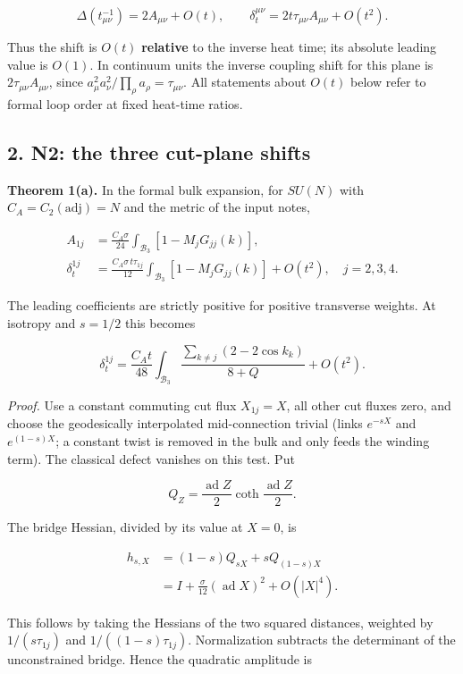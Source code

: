 \documentclass[11pt,a4paper]{article}
\begin{document}
\[\Delta(t_{\mu\nu}^{-1})=2A_{\mu\nu}+O(t),\qquad
 \delta_t^{\mu\nu}=2t\tau_{\mu\nu}A_{\mu\nu}+O(t^2).\]

Thus the shift is \(O(t)\) \textbf{relative} to the inverse heat time;
its absolute leading value is \(O(1)\). In continuum units the inverse
coupling shift for this plane is \(2\tau_{\mu\nu}A_{\mu\nu}\), since
\(a_\mu^2a_\nu^2/\prod_\rho a_\rho=\tau_{\mu\nu}\). All statements about
\(O(t)\) below refer to formal loop order at fixed heat-time ratios.

\hypertarget{n2-the-three-cut-plane-shifts}{%
\subsection{2. N2: the three cut-plane
shifts}\label{n2-the-three-cut-plane-shifts}}

\textbf{Theorem 1(a).} In the formal bulk expansion, for \(SU(N)\) with
\(C_A=C_2(\mathrm{adj})=N\) and the metric of the input notes,

\[\boxed{\begin{aligned}
 A_{1j}&=\frac{C_A\sigma}{24}
 \int_{\mathcal B_3}[1-M_jG_{jj}(k)],\\
 \delta_t^{1j}&=\frac{C_A\sigma\,t\tau_{1j}}{12}
 \int_{\mathcal B_3}[1-M_jG_{jj}(k)]+O(t^2),\quad j=2,3,4.
\end{aligned}}\tag{4}\]

The leading coefficients are strictly positive for positive transverse
weights. At isotropy and \(s=1/2\) this becomes

\[\delta_t^{1j}=\frac{C_A t}{48}
 \int_{\mathcal B_3}\frac{\sum_{k\ne j}(2-2\cos k_k)}{8+Q}
 +O(t^2).\tag{5}\]

\emph{Proof.} Use a constant commuting cut flux \(X_{1j}=X\), all other
cut fluxes zero, and choose the geodesically interpolated mid-connection
trivial (links \(e^{-sX}\) and \(e^{(1-s)X}\); a constant twist is
removed in the bulk and only feeds the winding term). The classical
defect vanishes on this test. Put

\[Q_Z=\frac{\operatorname{ad}Z}{2}\coth\frac{\operatorname{ad}Z}{2}.
\]

The bridge Hessian, divided by its value at \(X=0\), is

\[\begin{aligned}
 h_{s,X}&=(1-s)Q_{sX}+sQ_{(1-s)X}\\
 &=I+\frac{\sigma}{12}(\operatorname{ad}X)^2+O(|X|^4).
\end{aligned}\]

This follows by taking the Hessians of the two squared distances,
weighted by \(1/(s\tau_{1j})\) and \(1/((1-s)\tau_{1j})\). Normalization
subtracts the determinant of the unconstrained bridge. Hence the
quadratic amplitude is
\end{document}
